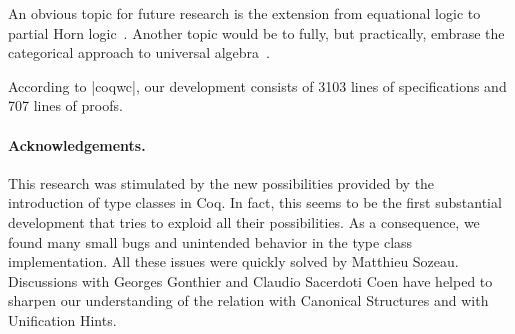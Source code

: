 \documentclass[a4paper,10pt, runningheads]{llncs}
\begin{document}
An obvious topic for future research is the extension from equational logic to partial Horn
logic~\cite{palmgren2007partial}. Another topic would be to fully, but practically, embrase the
categorical approach to universal algebra~\cite{pitts2001categorical}.

According to |coqwc|, our development consists of 3103 lines of specifications and 707 lines of
proofs.


% 

\paragraph{Acknowledgements.}
This research was stimulated by the new possibilities provided by the introduction of type classes
in Coq. In fact, this seems to be the first substantial development that tries to exploid all their
possibilities. As a consequence, we found many small bugs and unintended behavior in the type
class implementation. All these issues were quickly solved by Matthieu Sozeau. Discussions with
Georges Gonthier and Claudio Sacerdoti Coen have helped to
sharpen our understanding of the relation with Canonical Structures and with Unification Hints.


\end{document}
